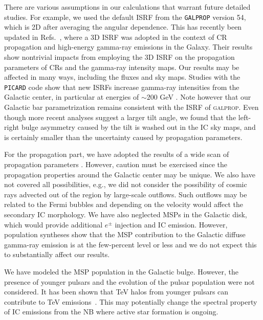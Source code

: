\documentclass[doublespace,nopageskip]{VTthesis} %
\begin{document}
There are various assumptions in our calculations that warrant future detailed studies. For example, we used the default ISRF from the {\tt GALPROP} version 54, which is 2D after averaging the angular dependence. This has recently been updated in Refs.~\cite{2017ApJ...846...67P,2018ApJ...856...45J}, where a 3D ISRF was adopted in the context of CR propagation and high-energy gamma-ray emissions in the Galaxy. Their results show nontrivial impacts from employing the 3D ISRF on the propagation parameters of CRs and the gamma-ray intensity maps. Our results may be affected in many ways, including the fluxes and sky maps. Studies with the {\tt PICARD} code show that new ISRFs increase gamma-ray intensities from the Galactic center, in particular at energies of $\sim 200 $ GeV \cite{2019APh...107....1N}. Note however that our Galactic bar parametrization remains consistent with the ISRF of \textsc{galprop}. Even though more recent analyses suggest a larger tilt angle, we found that the left-right bulge asymmetry caused by the tilt is washed out in the IC sky maps, and is certainly smaller than the uncertainty caused by propagation parameters.

For the propagation part, we have adopted the results of a wide scan of propagation parameters \cite{2016ApJ...824...16J}. However, caution must be exercised since the propagation properties around the Galactic center may be unique. We also have not covered all possibilities, e.g., we did not consider the possibility of cosmic rays advected out of the region by large-scale outflows. Such outflows may be related to the Fermi bubbles \cite{2015ApJ...808..107C} and depending on the velocity would affect the secondary IC morphology. We have also neglected MSPs in the Galactic disk, which would provide additional $e^\pm$ injection and IC emission. However, population syntheses show that the MSP contribution to the Galactic diffuse gamma-ray emission is at the few-percent level or less \cite{2018ApJ...863..199G} and we do not expect this to substantially affect our results.

We have modeled the MSP population in the Galactic bulge. However, the presence of younger pulsars and the evolution of the pulsar population were not considered. It has been shown that TeV halos from younger pulsars can contribute to TeV emissions~\cite{2018PDU....21...40H}. This may potentially change the spectral property of IC emissions from the NB where active star formation is ongoing.
\end{document}

